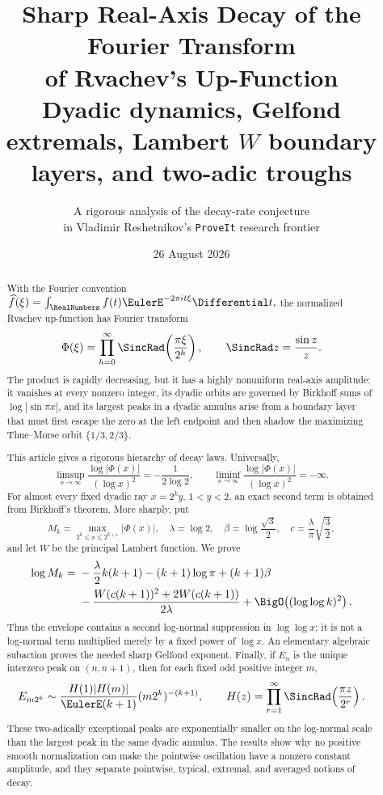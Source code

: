 \documentclass[11pt,oneside]{article}
\title{\bfseries Sharp Real-Axis Decay of the Fourier Transform\\
of Rvachev's Up-Function\\[0.35em]
\large Dyadic dynamics, Gelfond extremals, Lambert $W$ boundary layers, and two-adic troughs}
\author{A rigorous analysis of the decay-rate conjecture\\
\small in Vladimir Reshetnikov's \texttt{ProveIt} research frontier}
\date{26 August 2026}
\theoremstyle{definition}
\theoremstyle{remark}
\newcommand{\PhiF}{\Phi}
\begin{document}
\maketitle

\begin{abstract}
With the Fourier convention
\(
 \widehat f(\xi)=\int_{\RealNumbers}f(t)\EulerE^{-2\pi i t\xi}\Differential t,
\)
the normalized Rvachev up-function has Fourier transform
\[
 \PhiF(\xi)=\prod_{h=0}^{\infty}
 \SincRad\!\left(\frac{\pi\xi}{2^h}\right),
 \qquad \SincRad z=\frac{\sin z}{z}.
\]
The product is rapidly decreasing, but it has a highly nonuniform real-axis
amplitude: it vanishes at every nonzero integer, its dyadic orbits are governed
by Birkhoff sums of \(\log|\sin \pi x|\), and its largest peaks in a dyadic
annulus arise from a boundary layer that must first escape the zero at the
left endpoint and then shadow the maximizing Thue--Morse orbit
\(\{1/3,2/3\}\).

This article gives a rigorous hierarchy of decay laws.  Universally,
\[
 \limsup_{x\to\infty}
 \frac{\log|\PhiF(x)|}{(\log x)^2}
 =-\frac{1}{2\log 2},
 \qquad
 \liminf_{x\to\infty}
 \frac{\log|\PhiF(x)|}{(\log x)^2}=-\infty.
\]
For almost every fixed dyadic ray \(x=2^k y\), \(1<y<2\), an exact second
term is obtained from Birkhoff's theorem.  More sharply, put
\[
 M_k=\max_{2^k\le x\le 2^{k+1}}|\PhiF(x)|,
 \quad \lambda=\log 2,
 \quad \beta=\log\frac{\sqrt3}{2},
 \quad c=\frac{\lambda}{\pi}\sqrt{\frac32},
\]
and let \(W\) be the principal Lambert function.  We prove
\begin{align*}
 \log M_k={}&-\frac{\lambda}{2}k(k+1)
 -(k+1)\log\pi+(k+1)\beta\\
 &-\frac{W(c(k+1))^2+2W(c(k+1))}{2\lambda}
 +\BigO\!\left((\log\log k)^2\right).
\end{align*}
Thus the envelope contains a second log-normal suppression in
\(\log\log x\); it is not a log-normal term multiplied merely by a fixed
power of \(\log x\).  An elementary algebraic subaction proves the needed
sharp Gelfond exponent.  Finally, if \(E_n\) is the unique interzero peak on
\((n,n+1)\), then for each fixed odd positive integer \(m\),
\[
 E_{m2^k}\sim
 \frac{H(1)|H(m)|}{\EulerE(k+1)}(m2^k)^{-(k+1)},
 \qquad
 H(z)=\prod_{r=1}^{\infty}\SincRad\!\left(\frac{\pi z}{2^r}\right).
\]
These two-adically exceptional peaks are exponentially smaller on the
log-normal scale than the largest peak in the same dyadic annulus.  The
results show why no positive smooth normalization can make the pointwise
oscillation have a nonzero constant amplitude, and they separate pointwise,
typical, extremal, and averaged notions of decay.
\end{abstract}
\end{document}
